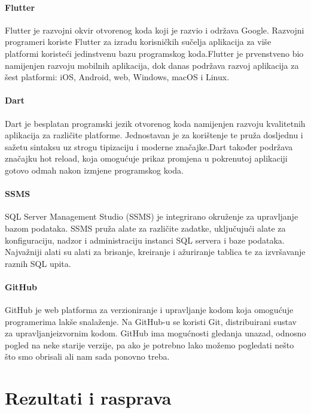 \documentclass[diplomskirad]{fer}
\begin{document}
\subsubsection{Flutter}
Flutter je razvojni okvir otvorenog koda koji je razvio i održava Google. Razvojni programeri koriste Flutter za izradu korisničkih sučelja aplikacija za više platformi koristeći jedinstvenu bazu programskog koda.Flutter je prvenstveno bio namijenjen razvoju mobilnih aplikacija, dok danas podržava razvoj aplikacija za šest platformi: iOS, Android, web, Windows, macOS i Linux. \cite{Flutter}
\subsubsection{Dart}
Dart je besplatan programski jezik otvorenog koda namijenjen razvoju kvalitetnih aplikacija za različite platforme. Jednostavan je za korištenje te pruža dosljednu i sažetu sintaksu uz strogu tipizaciju i moderne značajke.Dart također podržava značajku hot reload, koja omogućuje prikaz promjena u pokrenutoj aplikaciji gotovo odmah nakon izmjene programskog koda.
\cite{Dart}
\subsubsection{SSMS}
SQL Server Management Studio (SSMS) je integrirano okruženje za upravljanje bazom podataka. SSMS pruža alate za različite zadatke, uključujući alate za konfiguraciju, nadzor i administraciju instanci SQL servera i baze podataka. Najvažniji alati su alati za brisanje, kreiranje i ažuriranje tablica te za izvršavanje raznih SQL upita. \cite{SSMS}
\subsubsection{GitHub}
GitHub je web platforma za verzioniranje i upravljanje kodom koja omogućuje programerima lakše snalaženje. Na GitHub-u se koristi Git, distribuirani sustav za upravljanjeizvornim kodom. GitHub ima mogućnosti gledanja unazad, odnosno pogled na neke starije verzije, pa ako je potrebno lako možemo pogledati nešto što smo obrisali ali nam sada ponovno treba. \cite{GIT}

\label{pog:glavni_dio}


\chapter{Rezultati i rasprava}
\label{pog:rezultati_i_rasprava}
\end{document}
